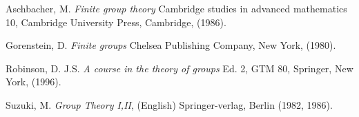 \documentclass[12pt]{article}
\begin{document}

\begin{thebibliography}{10}

Aschbacher, M. 
\emph{Finite group theory} Cambridge studies in advanced mathematics 10, 
Cambridge University Press, Cambridge, (1986).

Gorenstein, D.
\emph{Finite groups} Chelsea Publishing Company, New York, (1980).

Robinson, D. J.S.
\emph{A course in the theory of groups} Ed. 2, GTM 80, Springer, New York, (1996).

Suzuki, M.
\emph{Group Theory I,II}, (English) Springer-verlag, Berlin (1982, 1986).


\end{thebibliography}
\end{document}
